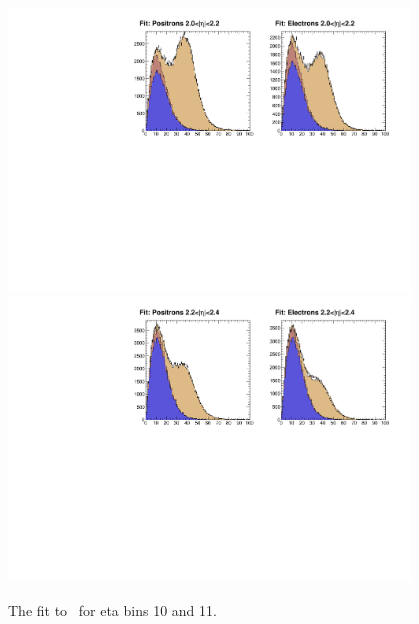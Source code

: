 \begin{figure}
  \begin{center}
\includegraphics[width=0.95\textwidth]{data_9.pdf} \\
\includegraphics[width=0.95\textwidth]{data_10.pdf}
  \caption{  \label{fig:data4} The fit to \MET\ for eta bins 10 and 11.}
   \end{center}
\end{figure}

